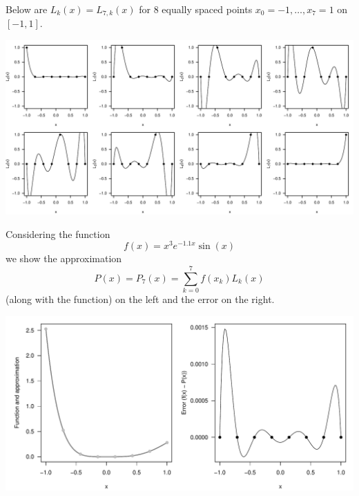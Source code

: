 \documentclass[12pt]{article}
\begin{document}
Below are \(L_k(x) = L_{7, k}(x)\) for \(8\) equally spaced points \(x_0 = -1, \dots, x_7 = 1\) on \([-1, 1]\). 

\includegraphics[width=\textwidth]{Li.pdf}

Considering the function \[f(x) = x^3e^{-1.1x}\sin(x)\] we show the approximation \[P(x) = P_7(x) = \sum_{k=0}^7 f(x_k)L_k(x)\] (along with the function) on the left and the error on the right.

\includegraphics[width=\textwidth]{fP.pdf}
\end{document}

